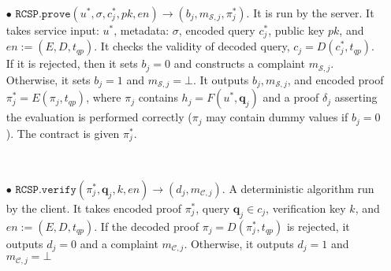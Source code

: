 \begin{definition}[RC-S-P Scheme]
\begin{itemize}
\

\item[$\bullet$] $\mathtt{RCSP}.\mathtt{prove}(u^{\scriptscriptstyle *},  \sigma,  c^{\scriptscriptstyle *}_{\scriptscriptstyle j},pk, en)\rightarrow (b_{\scriptscriptstyle j},m_{\scriptscriptstyle \mathcal{S},j},\pi^{\scriptscriptstyle *}_{\scriptscriptstyle j})$. It is run by the server. It  takes service input: $u^{\scriptscriptstyle *}$, metadata: $\sigma$,   encoded query $c^{\scriptscriptstyle *}_{\scriptscriptstyle j}$, public key $pk$,  and $en:=(E,D,t_{\scriptscriptstyle qp})$.  It checks the validity of decoded query, $c_{\scriptscriptstyle j}=D(c^{\scriptscriptstyle *}_{\scriptscriptstyle j},t_{\scriptscriptstyle qp})$.  If it is rejected, then it sets $b_{\scriptscriptstyle j}=0$ and constructs a complaint $m_{\scriptscriptstyle \mathcal{S},j}$. Otherwise,  it   sets $b_{\scriptscriptstyle j}=1$ and $m_{\scriptscriptstyle \mathcal{S},j}=\bot$. It outputs $b_{\scriptscriptstyle j},m_{\scriptscriptstyle \mathcal{S},j}$,   and  encoded proof $\pi^{\scriptscriptstyle *}_{\scriptscriptstyle j}=E(\pi_{\scriptscriptstyle j},t_{\scriptscriptstyle qp})$, where  $\pi_{\scriptscriptstyle j}$ contains $h_{\scriptscriptstyle j}=F(u^{\scriptscriptstyle *},\bm{q}_{\scriptscriptstyle j})$ and a proof $\delta_{\scriptscriptstyle j}$  asserting the evaluation is performed correctly ($\pi_{\scriptscriptstyle j}$ may contain dummy values if $b_{\scriptscriptstyle j}=0$). The contract is given $\pi^{\scriptscriptstyle *}_{\scriptscriptstyle j}$.




\

\item[$\bullet$] $\mathtt{RCSP}.\mathtt{verify}(\pi^{\scriptscriptstyle *}_{\scriptscriptstyle j}, \bm{q}_{\scriptscriptstyle j},k,en)\rightarrow (d_{\scriptscriptstyle j},m_{\scriptscriptstyle \mathcal{C},j})$. A deterministic algorithm run by the client. It takes encoded proof $\pi^{\scriptscriptstyle *}_{\scriptscriptstyle j}$,  query $\bm{q}_{\scriptscriptstyle j}\in c_{\scriptscriptstyle j}$,  verification key  $k$,  and $en:=(E,D,t_{\scriptscriptstyle qp})$. If the decoded proof $\pi_{\scriptscriptstyle j}=D(\pi^{\scriptscriptstyle *}_{\scriptscriptstyle j},t_{\scriptscriptstyle qp})$ is rejected,  it outputs $d_{\scriptscriptstyle j}=0$ and a complaint $m_{\scriptscriptstyle \mathcal{C},j}$. Otherwise, it outputs  $d_{\scriptscriptstyle j}=1$ and $m_{\scriptscriptstyle \mathcal{C},j}=\bot$





\end{itemize}
\end{definition}
